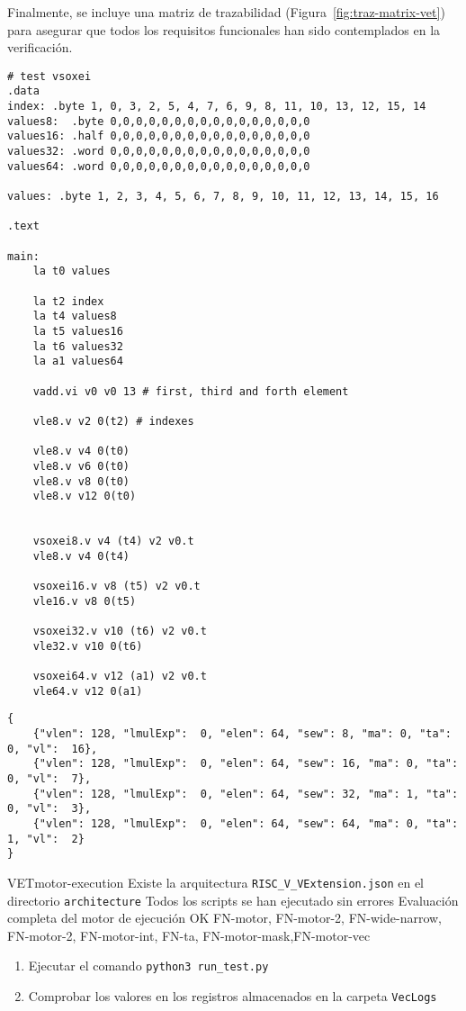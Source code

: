Finalmente, se incluye una matriz de trazabilidad (Figura~\ref{fig:traz-matrix-vet}) para asegurar que todos los requisitos funcionales han sido contemplados en la verificación.

\begin{lstlisting}[caption=Ejemplo de prueba en ensamblador, label=example-assembly]
# test vsoxei
.data
index: .byte 1, 0, 3, 2, 5, 4, 7, 6, 9, 8, 11, 10, 13, 12, 15, 14
values8:  .byte 0,0,0,0,0,0,0,0,0,0,0,0,0,0,0,0 
values16: .half 0,0,0,0,0,0,0,0,0,0,0,0,0,0,0,0 
values32: .word 0,0,0,0,0,0,0,0,0,0,0,0,0,0,0,0
values64: .word 0,0,0,0,0,0,0,0,0,0,0,0,0,0,0,0

values: .byte 1, 2, 3, 4, 5, 6, 7, 8, 9, 10, 11, 12, 13, 14, 15, 16

.text

main: 
    la t0 values

    la t2 index
    la t4 values8
    la t5 values16
    la t6 values32
    la a1 values64

    vadd.vi v0 v0 13 # first, third and forth element

    vle8.v v2 0(t2) # indexes

    vle8.v v4 0(t0) 
    vle8.v v6 0(t0) 
    vle8.v v8 0(t0) 
    vle8.v v12 0(t0)


    vsoxei8.v v4 (t4) v2 v0.t
    vle8.v v4 0(t4)

    vsoxei16.v v8 (t5) v2 v0.t
    vle16.v v8 0(t5)

    vsoxei32.v v10 (t6) v2 v0.t
    vle32.v v10 0(t6)

    vsoxei64.v v12 (a1) v2 v0.t
    vle64.v v12 0(a1)
\end{lstlisting}

\begin{lstlisting}[caption=Arquitecturas empleadas para la evaluación en forma de JSON, label=arquitecturas-test]
{
    {"vlen": 128, "lmulExp":  0, "elen": 64, "sew": 8, "ma": 0, "ta": 0, "vl":  16},
    {"vlen": 128, "lmulExp":  0, "elen": 64, "sew": 16, "ma": 0, "ta": 0, "vl":  7},
    {"vlen": 128, "lmulExp":  0, "elen": 64, "sew": 32, "ma": 1, "ta": 0, "vl":  3},
    {"vlen": 128, "lmulExp":  0, "elen": 64, "sew": 64, "ma": 0, "ta": 1, "vl":  2}
}
\end{lstlisting}

\begin{testCase}{VET}{motor-execution}
    {Existe la arquitectura \texttt{RISC\_V\_VExtension.json} en el directorio \texttt{architecture}} %
    {Todos los scripts se han ejecutado sin errores}
    {Evaluación completa del motor de ejecución} %
    {OK} %
    {FN-motor, FN-motor-2, FN-wide-narrow, FN-motor-2, FN-motor-int, FN-ta, FN-motor-mask,FN-motor-vec} %
    \begin{enumerate}
        \item Ejecutar el comando \texttt{python3 run\_test.py}
        \item Comprobar los valores en los registros almacenados en la carpeta \texttt{VecLogs}
    \end{enumerate}
\end{testCase}

